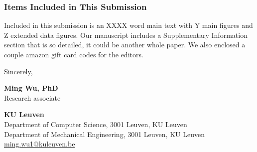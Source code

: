 \documentclass[10pt]{article}
\begin{document}
\subsubsection{Items Included in This Submission}
\noindent Included in this submission is an XXXX word main text with Y main figures and Z extended data figures. Our manuscript includes a Supplementary Information section that is so detailed, it could be another whole paper. We also enclosed a couple amazon gift card codes for the editors. 


\vspace{0.5cm}
Sincerely,

\vspace{0cm}
\textcolor{KULBlue_D}{\textbf{Ming Wu, PhD}}\\
\textcolor{KULBlue_C}{Research associate}

\vspace{0cm}
\color{KULBlue_D}
\textbf{KU Leuven}\\
\color{KULBlue_C}
Department of Computer Science, 3001 Leuven, KU Leuven\\
Department of Mechanical Engineering, 3001 Leuven, KU Leuven\\
\underline{\textcolor{KULBlue_D}{ming.wu1@kuleuven.be}}
% 
% 
\end{document}
